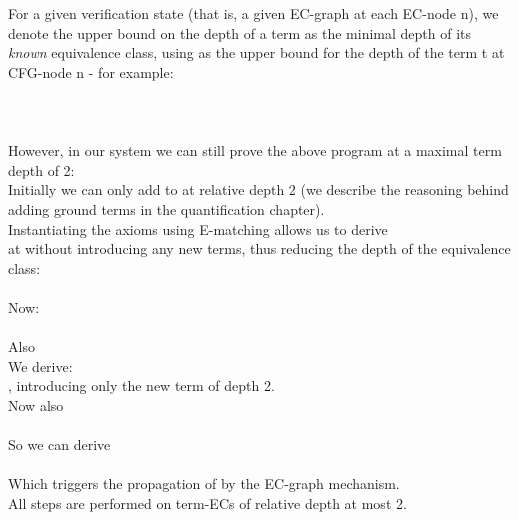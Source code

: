 For a given verification state (that is, a given EC-graph  at each EC-node n), we denote the upper bound on the depth of a term as the minimal depth of its \emph{known} equivalence class, using  as the upper bound for the depth of the term t at CFG-node n - for example:\\
\\
\\
\\
However, in our system we can still prove the above program at a maximal term depth of 2:\\
Initially we can only add  to  at relative depth 2 (we describe the reasoning behind adding ground terms in the quantification chapter).\\
Instantiating the axioms using E-matching allows us to derive \\
 at  without introducing any new terms,
thus reducing the depth of the equivalence class:\\
\\
Now:\\
\\
Also
\\
We derive:\\
, introducing only the new term  of depth 2.\\
Now also \\
\\
So we can derive\\
\\
Which triggers the propagation of  by the EC-graph mechanism.\\
All steps are performed on term-ECs of relative depth at most 2.

